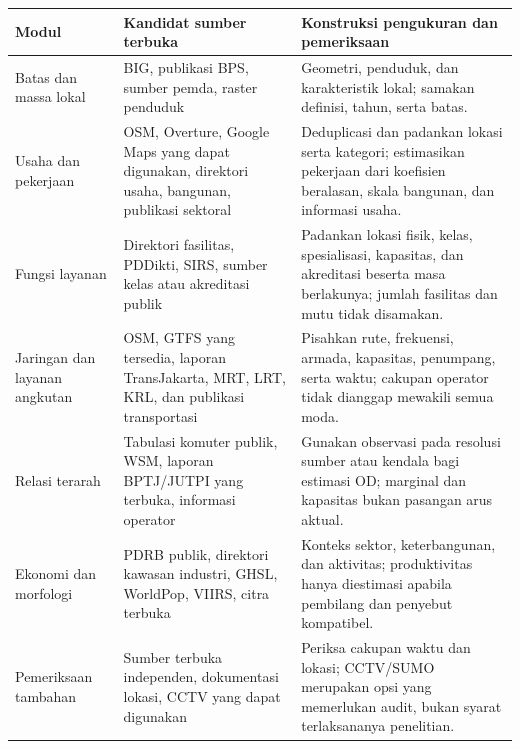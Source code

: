 \documentclass[11pt,a4paper,oneside,openany,indonesian]{report}
\begin{document}
{\def\LTcaptype{none} %
\begin{longtable}[]{@{}
  >{\raggedright\arraybackslash}p{}
  >{\raggedright\arraybackslash}p{}
  >{\raggedright\arraybackslash}p{}@{}}
\toprule\noalign{}
\begin{minipage}[b]{\linewidth}\raggedright
Modul
\end{minipage} & \begin{minipage}[b]{\linewidth}\raggedright
Kandidat sumber terbuka
\end{minipage} & \begin{minipage}[b]{\linewidth}\raggedright
Konstruksi pengukuran dan pemeriksaan
\end{minipage} \\
\midrule\noalign{}
\endhead
\bottomrule\noalign{}
\endlastfoot
Batas dan massa lokal & BIG, publikasi BPS, sumber pemda, raster
penduduk & Geometri, penduduk, dan karakteristik lokal; samakan
definisi, tahun, serta batas. \\
Usaha dan pekerjaan & OSM, Overture, Google Maps yang dapat digunakan,
direktori usaha, bangunan, publikasi sektoral & Deduplicasi dan padankan
lokasi serta kategori; estimasikan pekerjaan dari koefisien beralasan,
skala bangunan, dan informasi usaha. \\
Fungsi layanan & Direktori fasilitas, PDDikti, SIRS, sumber kelas atau
akreditasi publik & Padankan lokasi fisik, kelas, spesialisasi,
kapasitas, dan akreditasi beserta masa berlakunya; jumlah fasilitas dan
mutu tidak disamakan. \\
Jaringan dan layanan angkutan & OSM, GTFS yang tersedia, laporan
TransJakarta, MRT, LRT, KRL, dan publikasi transportasi & Pisahkan rute,
frekuensi, armada, kapasitas, penumpang, serta waktu; cakupan operator
tidak dianggap mewakili semua moda. \\
Relasi terarah & Tabulasi komuter publik, WSM, laporan BPTJ/JUTPI yang
terbuka, informasi operator & Gunakan observasi pada resolusi sumber
atau kendala bagi estimasi OD; marginal dan kapasitas bukan pasangan
arus aktual. \\
Ekonomi dan morfologi & PDRB publik, direktori kawasan industri, GHSL,
WorldPop, VIIRS, citra terbuka & Konteks sektor, keterbangunan, dan
aktivitas; produktivitas hanya diestimasi apabila pembilang dan penyebut
kompatibel. \\
Pemeriksaan tambahan & Sumber terbuka independen, dokumentasi lokasi,
CCTV yang dapat digunakan & Periksa cakupan waktu dan lokasi; CCTV/SUMO
merupakan opsi yang memerlukan audit, bukan syarat terlaksananya
penelitian. \\
\end{longtable}
}
\end{document}
